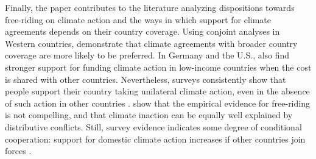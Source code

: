 \documentclass[12pt,english]{article}
\begin{document}
\begin{bibunit}
Finally, the paper contributes to the literature analyzing dispositions towards free-riding on climate action and the ways in which support for climate agreements depends on their country coverage. 
Using conjoint analyses in Western countries, 
\cite{beiser-mcgrath_could_2019} demonstrate that climate agreements with broader country coverage are %
more likely to be preferred. In Germany and the U.S., \cite{gampfer_obtaining_2014} also find stronger support for funding climate action in low-income countries when the cost is shared with other countries. Nevertheless, surveys consistently show that people support their country taking unilateral climate action, even in the absence of such action in other countries \citep{bernauer_how_2015,mcgrath_how_2017,beiser-mcgrath_commitment_2019%
}. \cite{aklin_prisoners_2020} show that the empirical evidence for free-riding is not compelling, and that climate inaction can be equally well explained by distributive conflicts. Still, survey evidence indicates some degree of conditional cooperation: support for domestic climate action increases if other countries join forces \citep{carlsson_importance_2025,tam_they_2025}. 




\end{bibunit}
\end{document}
